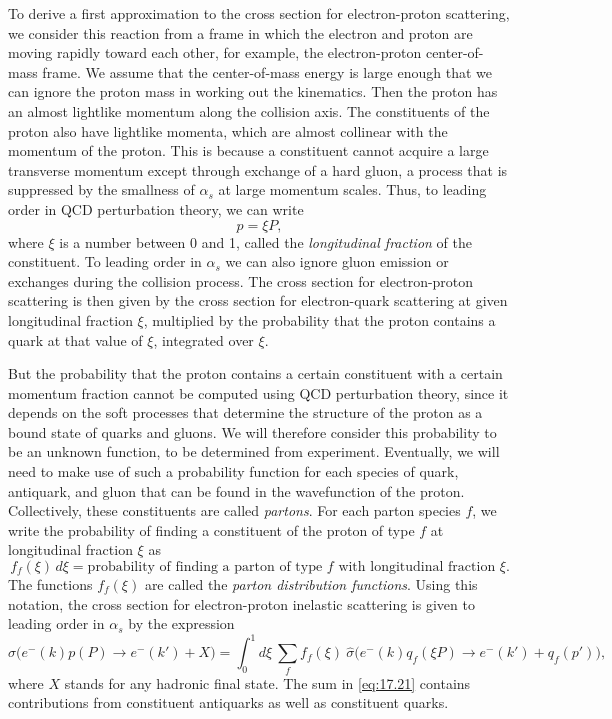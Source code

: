 To derive a first approximation to the cross section for electron-proton
scattering, we consider this reaction from a frame in which the electron and
proton are moving rapidly toward each other, for example, the electron-proton
center-of-mass frame.  We assume that the center-of-mass energy is large
enough that we can ignore the proton mass in working out the kinematics.
Then the proton has an almost lightlike momentum along the collision axis.
The constituents of the proton also have lightlike momenta, which are almost
collinear with the momentum of the proton.  This is because a constituent
cannot acquire a large transverse momentum except through exchange of a hard
gluon, a process that is suppressed by the smallness of $\alpha_s$ at large
momentum scales.  Thus, to leading order in QCD perturbation theory, we can
write
\begin{equation}
  p = \xi P ,
  \label{eq:17.19}
\end{equation}
where $\xi$ is a number between 0 and 1, called the \emph{longitudinal
fraction} of the constituent.  To leading order in $\alpha_s$ we can also
ignore gluon emission or exchanges during the collision process.  The cross
section for electron-proton scattering is then given by the cross section for
electron-quark scattering at given longitudinal fraction $\xi$, multiplied by
the probability that the proton contains a quark at that value of $\xi$,
integrated over $\xi$.

But the probability that the proton contains a certain constituent with a
certain momentum fraction cannot be computed using QCD perturbation theory,
since it depends on the soft processes that determine the structure of the
proton as a bound state of quarks and gluons.  We will therefore consider
this probability to be an unknown function, to be determined from experiment.
Eventually, we will need to make use of such a probability function for each
species of quark, antiquark, and gluon that can be found in the wavefunction
of the proton.  Collectively, these constituents are called \emph{partons}.
For each parton species $f$, we write the probability of finding a
constituent of the proton of type $f$ at longitudinal fraction $\xi$ as
\begin{equation}
  f_f(\xi)\,d\xi = \text{probability of finding a parton of type } f
    \text{ with longitudinal fraction } \xi .
  \label{eq:17.20}
\end{equation}
The functions $f_f(\xi)$ are called the \emph{parton distribution functions}.
Using this notation, the cross section for electron-proton inelastic
scattering is given to leading order in $\alpha_s$ by the expression
\begin{equation}
  \sigma\bigl( e^{-}(k)p(P) \to e^{-}(k') + X \bigr)
  = \int_0^1 d\xi\ \sum_f f_f(\xi)\ \hat{\sigma}\bigl( e^{-}(k)q_f(\xi P)
    \to e^{-}(k') + q_f(p') \bigr) ,
  \label{eq:17.21}
\end{equation}
where $X$ stands for any hadronic final state.  The sum in \eqref{eq:17.21}
contains contributions from constituent antiquarks as well as constituent
quarks.

